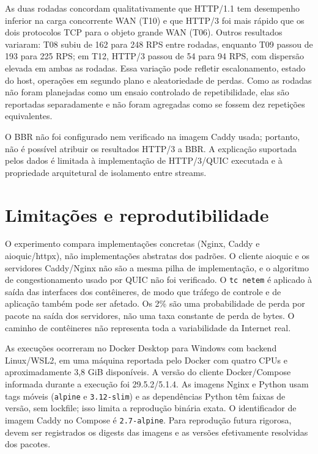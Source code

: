 \documentclass[12pt,a4paper]{article}
\begin{document}
As duas rodadas concordam qualitativamente que HTTP/1.1 tem desempenho inferior na carga
concorrente WAN (T10) e que HTTP/3 foi mais rápido que os dois protocolos TCP para o objeto
grande WAN (T06). Outros resultados variaram: T08 subiu de 162 para 248 RPS entre rodadas,
enquanto T09 passou de 193 para 225 RPS; em T12, HTTP/3 passou de 54 para 94 RPS, com
dispersão elevada em ambas as rodadas. Essa variação pode refletir escalonamento, estado do
host, operações em segundo plano e aleatoriedade de perdas. Como as rodadas não foram
planejadas como um ensaio controlado de repetibilidade, elas são reportadas separadamente e
não foram agregadas como se fossem dez repetições equivalentes.

O BBR não foi configurado nem verificado na imagem Caddy usada; portanto, não é possível
atribuir os resultados HTTP/3 a BBR. A explicação suportada pelos dados é limitada à
implementação de HTTP/3/QUIC executada e à propriedade arquitetural de isolamento entre
streams.

\section{Limitações e reprodutibilidade}

O experimento compara implementações concretas (Nginx, Caddy e aioquic/httpx), não
implementações abstratas dos padrões. O cliente aioquic e os servidores Caddy/Nginx não são
a mesma pilha de implementação, e o algoritmo de congestionamento usado por QUIC não foi
verificado. O \texttt{tc netem} é aplicado à saída das interfaces dos contêineres, de modo que
tráfego de controle e de aplicação também pode ser afetado. Os 2\% são uma probabilidade de
perda por pacote na saída dos servidores, não uma taxa constante de perda de bytes. O caminho
de contêineres não representa toda a variabilidade da Internet real.

As execuções ocorreram no Docker Desktop para Windows com backend Linux/WSL2, em uma
máquina reportada pelo Docker com quatro CPUs e aproximadamente 3,8 GiB disponíveis. A
versão do cliente Docker/Compose informada durante a execução foi 29.5.2/5.1.4. As imagens
Nginx e Python usam tags móveis (\texttt{alpine} e \texttt{3.12-slim}) e as dependências
Python têm faixas de versão, sem lockfile; isso limita a reprodução binária exata. O
identificador de imagem Caddy no Compose é \texttt{2.7-alpine}. Para reprodução futura
rigorosa, devem ser registrados os digests das imagens e as versões efetivamente resolvidas
dos pacotes.
\end{document}
